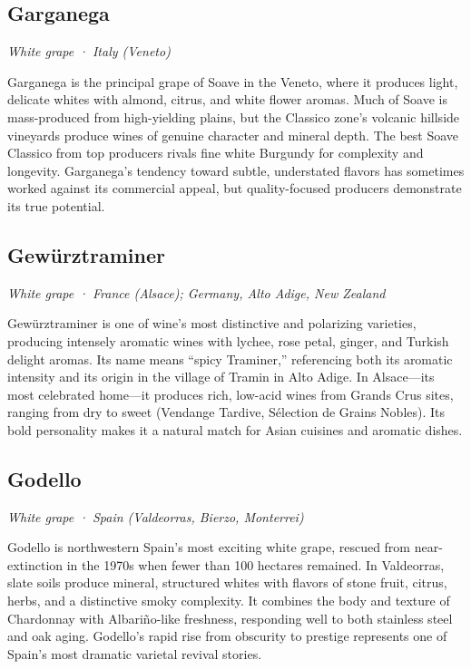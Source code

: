 \subsection*{Garganega}
\textit{White grape · Italy (Veneto)}\par\smallskip

Garganega is the principal grape of Soave in the Veneto, where it produces light, delicate whites with almond, citrus, and white flower aromas. Much of Soave is mass-produced from high-yielding plains, but the Classico zone’s volcanic hillside vineyards produce wines of genuine character and mineral depth. The best Soave Classico from top producers rivals fine white Burgundy for complexity and longevity. Garganega’s tendency toward subtle, understated flavors has sometimes worked against its commercial appeal, but quality-focused producers demonstrate its true potential.

\subsection*{Gewürztraminer}
\textit{White grape · France (Alsace); Germany, Alto Adige, New Zealand}\par\smallskip

Gewürztraminer is one of wine’s most distinctive and polarizing varieties, producing intensely aromatic wines with lychee, rose petal, ginger, and Turkish delight aromas. Its name means “spicy Traminer,” referencing both its aromatic intensity and its origin in the village of Tramin in Alto Adige. In Alsace—its most celebrated home—it produces rich, low-acid wines from Grands Crus sites, ranging from dry to sweet (Vendange Tardive, Sélection de Grains Nobles). Its bold personality makes it a natural match for Asian cuisines and aromatic dishes.

\subsection*{Godello}
\textit{White grape · Spain (Valdeorras, Bierzo, Monterrei)}\par\smallskip

Godello is northwestern Spain’s most exciting white grape, rescued from near-extinction in the 1970s when fewer than 100 hectares remained. In Valdeorras, slate soils produce mineral, structured whites with flavors of stone fruit, citrus, herbs, and a distinctive smoky complexity. It combines the body and texture of Chardonnay with Albariño-like freshness, responding well to both stainless steel and oak aging. Godello’s rapid rise from obscurity to prestige represents one of Spain’s most dramatic varietal revival stories.

